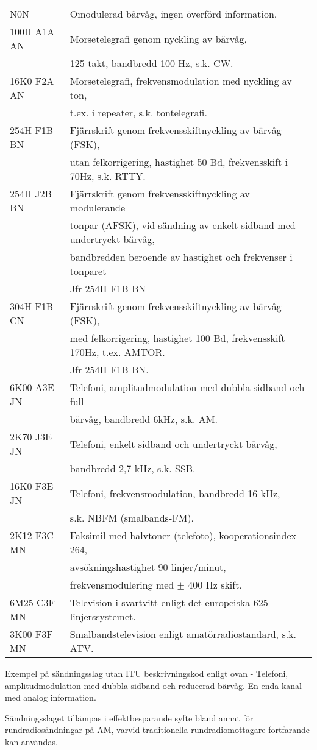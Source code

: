 \begin{tabular}{ll}
	N0N & Omodulerad bärvåg, ingen överförd information.\\
	100H A1A AN & Morsetelegrafi genom nyckling av bärvåg,\\
	& 125-takt, bandbredd 100 Hz, s.k. CW.\\
	16K0 F2A AN & Morsetelegrafi, frekvensmodulation med nyckling av ton,\\
	& t.ex. i repeater, s.k. tontelegrafi.\\
	254H F1B BN & Fjärrskrift genom frekvensskiftnyckling av bärvåg (FSK),\\
	& utan felkorrigering, hastighet 50 Bd, frekvensskift i 70Hz, s.k. RTTY.\\
	254H J2B BN & Fjärrskrift genom frekvensskiftnyckling av modulerande\\
	& tonpar (AFSK), vid sändning av enkelt sidband med undertryckt bärvåg,\\
	& bandbredden beroende av hastighet och frekvenser i tonparet\\
	& Jfr 254H F1B BN\\
	304H F1B CN & Fjärrskrift genom frekvensskiftnyckling av bärvåg (FSK),\\
	& med felkorrigering, hastighet 100 Bd, frekvensskift 170Hz, t.ex. AMTOR.\\
	& Jfr 254H F1B BN.\\
	6K00 A3E JN & Telefoni, amplitudmodulation med dubbla sidband och full\\
	& bärvåg, bandbredd 6kHz, s.k. AM.\\
	2K70 J3E JN & Telefoni, enkelt sidband och undertryckt bärvåg,\\
	& bandbredd 2,7 kHz, s.k. SSB.\\
	16K0 F3E JN & Telefoni, frekvensmodulation, bandbredd 16 kHz,\\
	& s.k. NBFM (smalbands-FM).\\
	2K12 F3C MN & Faksimil med halvtoner (telefoto), kooperationsindex 264,\\
	& avsökningshastighet 90 linjer/minut,\\
	& frekvensmodulering med \(\pm\) 400 Hz skift.\\
	6M25 C3F MN & Television i svartvitt enligt det europeiska 625-linjerssystemet.\\
	3K00 F3F MN & Smalbandstelevision enligt amatörradiostandard, s.k. ATV.\\
\end{tabular}

Exempel på sändningsslag utan ITU beskrivningskod enligt ovan
- Telefoni, amplitudmodulation med dubbla sidband och reducerad bärvåg.
En enda kanal med analog information.

Sändningsslaget tillämpas i effektbesparande syfte bland annat för
rundradiosändningar på AM, varvid traditionella rundradiomottagare fortfarande
kan användas.
